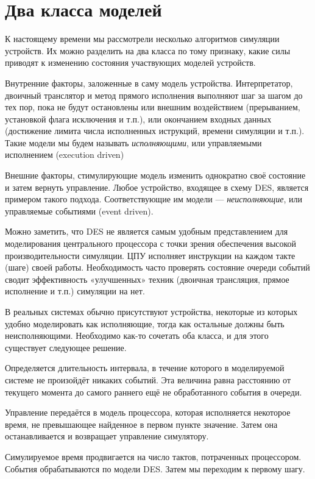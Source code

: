 \section[Два класса моделей]{Два класса моделей}

К настоящему времени мы рассмотрели несколько алгоритмов симуляции устройств. Их можно разделить на два класса по тому признаку, какие силы приводят к изменению состояния участвующих моделей устройств.

\begin{enumerate*}
    \item Внутренние факторы, заложенные в саму модель устройства. Интерпретатор, двоичный транслятор и метод прямого исполнения выполняют шаг за шагом до тех пор, пока не будут остановлены или внешним воздействием (прерыванием, установкой флага исключения и т.п.), или окончанием входных данных (достижение лимита числа исполненных иструкций, времени симуляции и т.п.). Такие модели мы будем называть \textit{исполняющими}, или управляемыми исполнением (\abbr execution driven)
    \item Внешние факторы, стимулирующие модель изменить однократно своё состояние и затем вернуть управление. Любое устройство, входящее в схему DES, является примером такого подхода. Соответствующие им модели --- \textit{неисполняющие}, или управляемые событиями (\abbr event driven).
\end{enumerate*}

Можно заметить, что DES не является самым удобным представлением для моделирования центрального процессора с точки зрения обеспечения высокой производительности симуляции. ЦПУ исполняет инструкции на каждом такте (шаге) своей работы. Необходимость часто проверять состояние очереди событий сводит эффективность «улучшенных» техник (двоичная трансляция, прямое исполнение и т.п.) симуляции на нет. 

В реальных системах обычно присутствуют устройства, некоторые из которых удобно моделировать как исполняющие, тогда как остальные должны быть неисполняющими. Необходимо как-то сочетать оба класса, и для этого существует следующее решение.

\begin{enumerate*}
\item Определяется длительность интервала, в течение которого в моделируемой системе не произойдёт никаких событий. Эта величина равна расстоянию от текущего момента до самого раннего ещё не обработанного события в очереди.

\item Управление передаётся в модель процессора, которая исполняется  некоторое время, не превышающее найденное в первом пункте значение. Затем она останавливается и возвращает управление симулятору.

\item Симулируемое время продвигается на число тактов, потраченных процессором. События обрабатываются по модели DES. Затем мы переходим к первому шагу.
\end{enumerate*}

